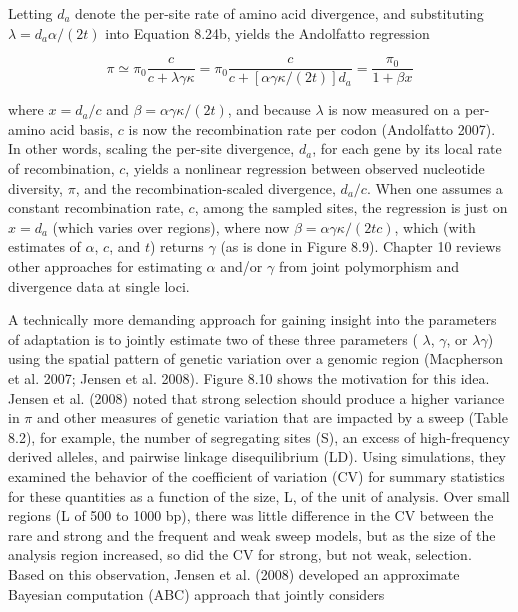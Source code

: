 \documentclass{article}
\begin{document}
Letting  $ d_a $ denote the per-site rate of amino acid divergence, and substituting  $ \lambda = d_a \alpha / (2t) $ into Equation 8.24b, yields the Andolfatto regression

\begin{equation}
\pi\simeq\pi_{0}\frac{c}{c+\lambda\gamma\kappa}=\pi_{0}\frac{c}{c+\left[\alpha\gamma\kappa/(2t)\right]d_{a}}=\frac{\pi_{0}}{1+\beta x}
\tag{8.25}
\label{eq:8_25}
\end{equation}

where  $ x = d_a / c $ and  $ \beta = \alpha \gamma \kappa / (2t) $, and because  $ \lambda $ is now measured on a per-amino acid basis,  $ c $ is now the recombination rate per codon (Andolfatto 2007). In other words, scaling the per-site divergence,  $ d_a $, for each gene by its local rate of recombination,  $ c $, yields a nonlinear regression between observed nucleotide diversity,  $ \pi $, and the recombination-scaled divergence,  $ d_a / c $. When one assumes a constant recombination rate,  $ c $, among the sampled sites, the regression is just on  $ x = d_a $ (which varies over regions), where now  $ \beta = \alpha \gamma \kappa / (2tc) $, which (with estimates of  $ \alpha $,  $ c $, and  $ t $) returns  $ \gamma $ (as is done in Figure 8.9). Chapter 10 reviews other approaches for estimating  $ \alpha $ and/or  $ \gamma $ from joint polymorphism and divergence data at single loci.

A technically more demanding approach for gaining insight into the parameters of adaptation is to jointly estimate two of these three parameters ( $ \lambda $,  $ \gamma $, or  $ \lambda\gamma $) using the spatial pattern of genetic variation over a genomic region (Macpherson et al. 2007; Jensen et al. 2008). Figure 8.10 shows the motivation for this idea. Jensen et al. (2008) noted that strong selection should produce a higher variance in  $ \pi $ and other measures of genetic variation that are impacted by a sweep (Table 8.2), for example, the number of segregating sites (S), an excess of high-frequency derived alleles, and pairwise linkage disequilibrium (LD). Using simulations, they examined the behavior of the coefficient of variation (CV) for summary statistics for these quantities as a function of the size, L, of the unit of analysis. Over small regions (L of 500 to 1000 bp), there was little difference in the CV between the rare and strong and the frequent and weak sweep models, but as the size of the analysis region increased, so did the CV for strong, but not weak, selection. Based on this observation, Jensen et al. (2008) developed an approximate Bayesian computation (ABC) approach that jointly considers
\end{document}
